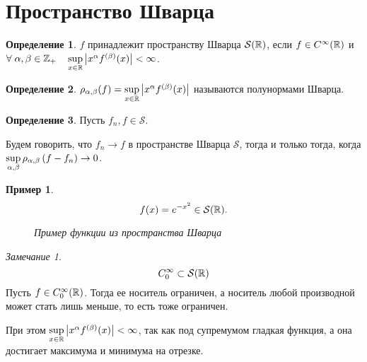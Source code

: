 \documentclass[a5paper, 10pt]{article}
\theoremstyle{definition}
\newtheorem{Def}{Определение}
\theoremstyle{plain}
\newtheorem{Ex}{Пример}
\theoremstyle{remark}
\newtheorem*{Note}{Замечание}
\begin{document}
    \section{Пространство Шварца}
    \begin{Def}
        $f$ принадлежит пространству Шварца $\mathcal S(\mathbb{R})$, если $f\in C^{\infty}(\mathbb{R})$ и  $\forall \; \alpha,\beta\in \mathbb{Z}_+ \quad \sup\limits_{x\in \mathbb{R}} \left|x^\alpha f^{(\beta)} (x)\right| < \infty$.
    \end{Def}
    \begin{Def}
        $\rho_{\alpha, \beta}(f) = \sup\limits_{x\in \mathbb{R}} \left|x^\alpha f^{(\beta)} (x)\right| $ называются полунормами Шварца.
    \end{Def}
    \begin{Def}
        Пусть $f_n,f \in \mathcal{S}$.

        Будем говорить, что $f_n \to f$ в пространстве Шварца $\mathcal S$, тогда и только тогда, когда $\sup\limits_{\alpha, \beta} \rho_{\alpha, \beta} \left(f-f_n\right) \rightarrow 0$.
    \end{Def}
    \begin{Ex}
        \[
        f(x) = e^{-x^2} \in \mathcal{S}(\mathbb{R}).
        \] 
            \begin{figure}[h!]
                \centering
                \caption{Пример функции из пространства Шварца}
                \label{gauss}
            \end{figure}
    \end{Ex}
    \begin{Note}
        \[
            C_0^{\infty} \subset \mathcal{S}(\mathbb{R})
        \] 
        Пусть $f\in C_0^\infty(\mathbb{R})$. Тогда ее носитель ограничен, а носитель любой производной может стать лишь меньше, то есть тоже ограничен. 

        При этом $\sup\limits_{x\in \mathbb{R}} \left|x^\alpha f^{(\beta)} (x)\right| < \infty$, так как под супремумом гладкая функция, а она достигает максимума и минимума на отрезке.
    \end{Note}
\end{document}
